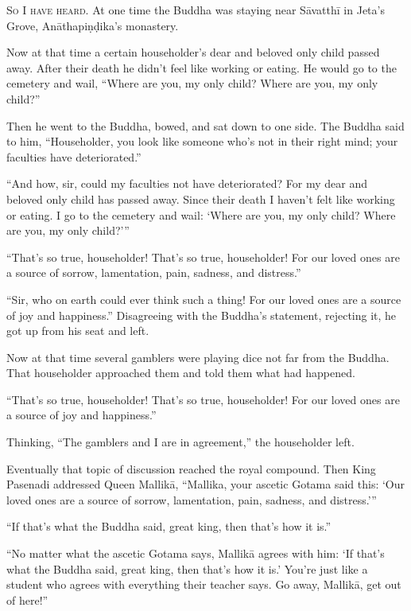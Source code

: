 \documentclass[12pt,openany]{book}%
\newcommand*{\scevam}[1]{\textsc{#1}}
\begin{document}
\scevam{So I have heard. }At one time the Buddha was staying near \textsanskrit{Sāvatthī} in Jeta’s Grove, \textsanskrit{Anāthapiṇḍika}’s monastery. 

Now at that time a certain householder’s dear and beloved only child passed away. After their death he didn’t feel like working or eating. He would go to the cemetery and wail, “Where are you, my only child? Where are you, my only child?” 

Then he went to the Buddha, bowed, and sat down to one side. The Buddha said to him, “Householder, you look like someone who’s not in their right mind; your faculties have deteriorated.” 

“And how, sir, could my faculties not have deteriorated? For my dear and beloved only child has passed away. Since their death I haven’t felt like working or eating. I go to the cemetery and wail: ‘Where are you, my only child? Where are you, my only child?’” 

“That’s so true, householder! That’s so true, householder! For our loved ones are a source of sorrow, lamentation, pain, sadness, and distress.” 

“Sir, who on earth could ever think such a thing! For our loved ones are a source of joy and happiness.” Disagreeing with the Buddha’s statement, rejecting it, he got up from his seat and left. 

Now at that time several gamblers were playing dice not far from the Buddha. That householder approached them and told them what had happened. 

“That’s so true, householder! That’s so true, householder! For our loved ones are a source of joy and happiness.” 

Thinking, “The gamblers and I are in agreement,” the householder left. 

Eventually that topic of discussion reached the royal compound. Then King Pasenadi addressed Queen \textsanskrit{Mallikā}, “Mallika, your ascetic Gotama said this: ‘Our loved ones are a source of sorrow, lamentation, pain, sadness, and distress.’” 

“If that’s what the Buddha said, great king, then that’s how it is.” 

“No matter what the ascetic Gotama says, \textsanskrit{Mallikā} agrees with him: ‘If that’s what the Buddha said, great king, then that’s how it is.’ You’re just like a student who agrees with everything their teacher says. Go away, \textsanskrit{Mallikā}, get out of here!” 
\end{document}
